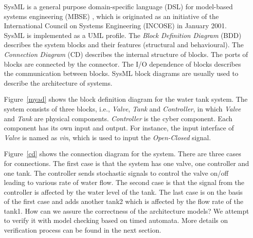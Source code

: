 \begin{figure}[htbp]
\end{figure}
SysML is a general purpose domain-specific language (DSL) \cite{SemerathBHSV17} for model-based systems engineering (MBSE) \cite{Dori16}, which is originated as an initiative of the International Council on Systems Engineering (INCOSE) \cite{Pepper2015International} in January 2001. SysML is implemented as a UML profile. The \textit{Block Definition Diagram }(BDD) describes the system blocks and their features (structural and behavioural). The\textit{ Connection Diagram} (CD) describes the internal structure of blocks. The ports of blocks are connected by the connector. The I/O dependence of blocks describes the communication between blocks. SysML block diagrams are usually used to describe the architecture of systems.

Figure~\ref{myad} shows the block definition diagram for the water tank system. The system consists of three blocks, i.e., \emph{Valve}, \emph{Tank} and \emph{Controller}, in which \emph{Valve} and \emph{Tank} are physical components. \emph{Controller} is the cyber component. Each component has its own input and output. For instance, the input interface of \emph{Valve} is named as \emph{vin}, which is used to input the \emph{Open-Closed} signal. 

Figure~\ref{cd} shows the connection diagram for the system. There are three cases for connections. The first case is that the system has one valve, one controller and one tank. The controller sends stochastic signals to control the valve on/off leading to various rate of water flow. The second case is that the signal from the controller is affected by the water level of the tank. The last case is on the basis of the first case and adds another tank2 which is affected by the flow rate of the tank1. How can we assure the correctness of the architecture models? We attempt to verify it with model checking based on timed automata. More details on verification process can be found in the next section.



